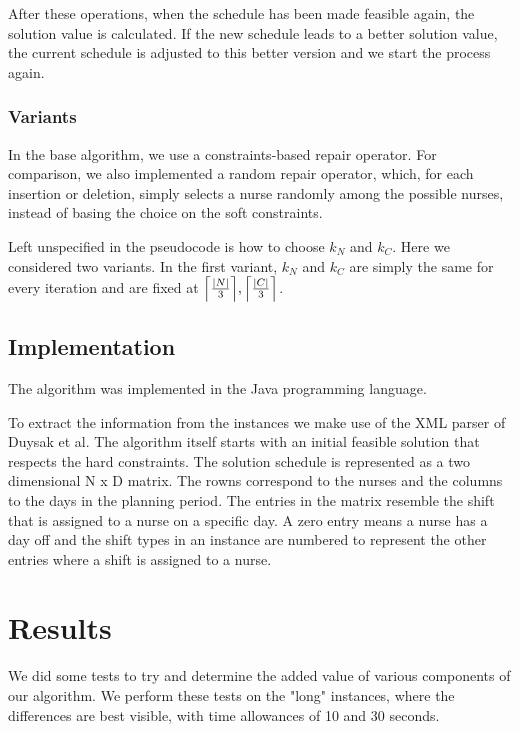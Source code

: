 \documentclass{article}
\begin{document}
After these operations, when the schedule has been made feasible again, the solution value is calculated.
If the new schedule leads to a better solution value, the current schedule is adjusted to this better version and we start the process again.

\subsubsection{Variants}

In the base algorithm, we use a constraints-based repair operator.
For comparison, we also implemented a random repair operator, which, for each insertion or deletion, simply selects a nurse randomly among the possible nurses, instead of basing the choice on the soft constraints.

Left unspecified in the pseudocode is how to choose $k_N$ and $k_C$.
Here we considered two variants.
In the first variant, $k_N$ and $k_C$ are simply the same for every iteration and are fixed at $\Bigl \lceil \frac{|N|}{3} \Bigr \rceil, \Bigl \lceil \frac{|C|}{3} \Bigr \rceil$.

\subsection{Implementation}

The algorithm was implemented in the Java programming language.

To extract the information from the instances we make use of the XML parser of Duysak et al.
The algorithm itself starts with an initial feasible solution that respects the hard constraints.
The solution schedule is represented as a two dimensional N x D matrix.
The rowns correspond to the nurses and the columns to the days in the planning period.
The entries in the matrix resemble the shift that is assigned to a nurse on a specific day.
A zero entry means a nurse has a day off and the shift types in an instance are numbered to represent the other entries where a shift is assigned to a nurse.

\section{Results}

We did some tests to try and determine the added value of various components of our algorithm.
We perform these tests on the "long" instances, where the differences are best visible, with time allowances of 10 and 30 seconds.
\end{document}
